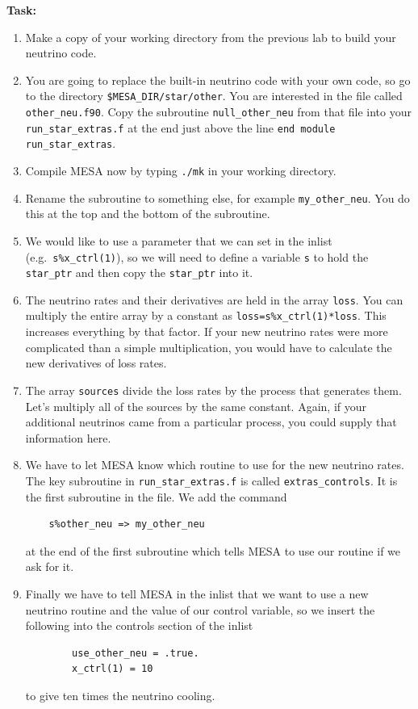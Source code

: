 \documentclass{article}
\begin{document}
\textbf{Task:}
\begin{enumerate}
 \setlength\itemsep{0em}
 \item 
Make a copy of your working directory from the previous lab to build your neutrino code.
\item 
You are going to replace the built-in neutrino code with your own code, so go to the directory \texttt{\$MESA\_DIR/star/other}.  You are interested in the file called \texttt{other\_neu.f90}.  Copy the subroutine \texttt{null\_other\_neu} from that file into your \texttt{run\_star\_extras.f} at the end just above the line \texttt{end module run\_star\_extras}.
\item Compile MESA now by typing \texttt{./mk} in your working directory.
\item Rename the subroutine to something else, for example \texttt{my\_other\_neu}.  You do this at the top and the bottom of the subroutine.
\item 
We would like to use a parameter that we can set in the inlist (e.g.\ \texttt{s\%x\_ctrl(1)}), so we will need to define a variable \texttt{s} to hold the \texttt{star\_ptr} and then copy the \texttt{star\_ptr} into it.
\item 
The neutrino rates and their derivatives are held in the array \texttt{loss}.  You can multiply the entire array by a constant as \texttt{loss=s\%x\_ctrl(1)*loss}.    This increases everything by that factor.  If your new neutrino rates were more complicated than a simple multiplication, you would have to calculate the new derivatives of loss rates.
\item 
The array \texttt{sources} divide the loss rates by the process that generates them.  Let's multiply all of the sources by the same constant.  Again, if your additional neutrinos came from a particular process, you could supply that information here.
\item
We have to let MESA know which routine to use for the new neutrino rates.  The key subroutine in \texttt{run\_star\_extras.f} is called \texttt{extras\_controls}.  It is the first subroutine in the file.  We add the command 
\begin{verbatim}
    s%other_neu => my_other_neu
\end{verbatim}
at the end of the first subroutine which tells MESA to use our routine if we ask for it.  
\item
Finally we have to tell MESA in the inlist that we want to use a new neutrino routine and the value of our control variable, so we insert the following into the controls section of the inlist
\begin{verbatim}
        use_other_neu = .true.
        x_ctrl(1) = 10
\end{verbatim}
to give ten times the neutrino cooling.
\end{enumerate}
\end{document}
